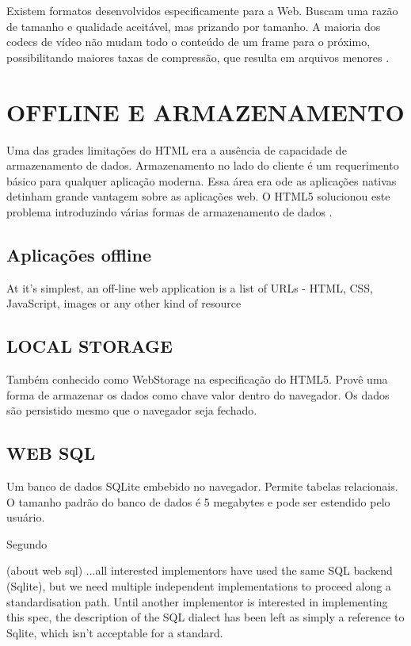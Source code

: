 \documentclass[
12pt,
a4paper,
portuges,
draft
]{report}
\renewenvironment{quote}
               {\list{}{\rightmargin\leftmargin}%
                \item\relax\fontsize{10}{12}}
               {\endlist}
\begin{document}
Existem formatos desenvolvidos especificamente para a Web. Buscam uma razão de tamanho e qualidade aceitável, mas prizando por tamanho. A maioria dos codecs de vídeo não mudam todo o conteúdo de um frame para o próximo, possibilitando maiores taxas de compressão, que resulta em arquivos menores \autocite{diveIntohtml}.


\section{OFFLINE E ARMAZENAMENTO}

Uma das grades limitações do HTML era a ausência de capacidade
de armazenamento de dados. Armazenamento no lado do cliente é um
requerimento básico para qualquer aplicação moderna. Essa área
era ode as aplicações nativas detinham grande vantagem sobre as
aplicações web. O HTML5 solucionou este problema introduzindo várias
formas de armazenamento de dados \autocite{html5Tradeoffs}.

\subsection{Aplicações offline}

At it's simplest, an off-line web application is a list of URLs -
HTML, CSS, JavaScript, images or any other kind of resource \autocite{diveIntohtml}

\subsection{LOCAL STORAGE}

Também conhecido como WebStorage na especificação do HTML5. Provê
uma forma de armazenar os dados como chave valor dentro do navegador. Os
dados são persistido mesmo que o navegador seja fechado.

\subsection{WEB SQL}
Um banco de dados SQLite embebido no navegador. Permite
tabelas relacionais. O tamanho padrão do banco de dados é 5 megabytes
e pode ser estendido pelo usuário.

Segundo \cite{diveIntohtml}
\begin{quote}
(about web sql) ...all interested implementors have used the same
SQL backend (Sqlite), but we need multiple independent
implementations to proceed along a standardisation path. Until
another implementor is interested in implementing this spec, the
description of the SQL dialect has been left as simply a reference
to Sqlite, which isn't acceptable for a standard.
\end{quote}
\end{document}
